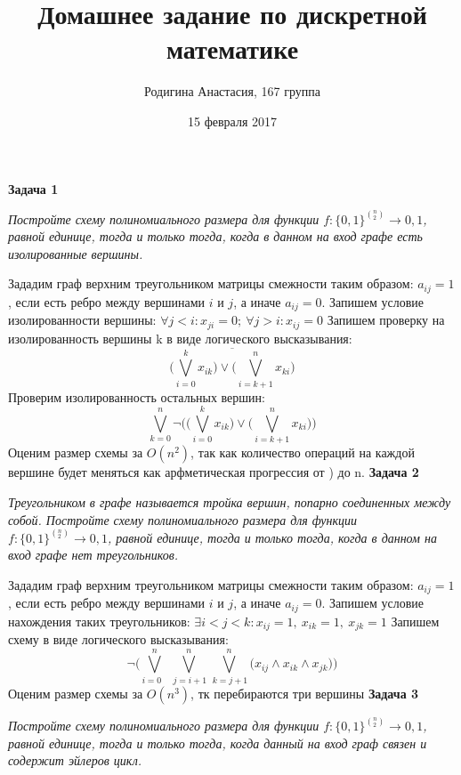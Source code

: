 \documentclass{article}
\title{Домашнее задание по дискретной математике}
\author{Родигина Анастасия, 167 группа}
\date{15 февраля  2017}
\begin{document}
            

\maketitle  
 \noindent \textbf{Задача 1}
\begin{center} 
\textit{Постройте схему полиномиального размера для функции $f : \{0, 1\}^{(^n_2)} \rightarrow {0, 1}$, равной единице, тогда и только тогда, когда в данном на вход графе есть изолированные вершины.}
\end{center}
Зададим граф верхним треугольником матрицы смежности таким образом: $a_{ij} = 1$, если есть ребро между вершинами $i$ и $j$, а иначе $a_{ij} = 0$. Запишем условие изолированности вершины: $\forall j < i: x_{ji}=0;~\forall j>i:x_{ij}=0$
Запишем проверку на изолированность вершины k в виде логического высказывания:
$$\overline{\big(\bigvee ^{k}_{i=0}x_{ik}\big)\vee \big(\bigvee ^{n}_{i=k+1}x_{ki}\big)}$$
Проверим изолированность остальных вершин:
$$\bigvee ^{n}_{k=0}\neg\big(\big(\bigvee ^{k}_{i=0}x_{ik}\big)\vee \big(\bigvee ^{n}_{i=k+1}x_{ki}\big)\big)$$
Оценим размер схемы за $O(n^2)$, так как количество операций на каждой вершине будет меняться как арфметическая прогрессия от ) до n.
\newline
\newline
\textbf{Задача 2}
\begin{center}
\textit{Треугольником в графе называется тройка вершин, попарно соединенных между собой. Постройте схему полиномиального размера для функции $f : \{0, 1\}^{(^n_2)} \rightarrow {0, 1}$, равной единице, тогда и только тогда, когда в данном на вход графе нет треугольников.}
\end{center}
Зададим граф верхним треугольником матрицы смежности таким образом: $a_{ij} = 1$, если есть ребро между вершинами $i$ и $j$, а иначе $a_{ij} = 0$. Запишем условие нахождения таких треугольников: $\exists i<j<k: x_{ij} = 1,~ x_{ik}=1,~x_{jk}=1$
Запишем схему в виде логического высказывания:
$$\neg \big(\bigvee^n_{i=0~~~}\bigvee^n_{~j=i+1} \bigvee^n_{~k=j+1}\big(x_{ij}\wedge x_{ik}\wedge x_{jk}\big) \big)$$
Оценим размер схемы за $O(n^3)$, тк перебираются три вершины
\newline 
\newline
 \noindent \textbf{Задача 3}
\begin{center}
\textit{Постройте схему полиномиального размера для функции $f : \{0, 1\}^{(^n_2)} \rightarrow {0, 1}$, равной единице, тогда и только тогда, когда данный на вход граф связен и содержит эйлеров цикл.} 
\end{center}
\end{document}
